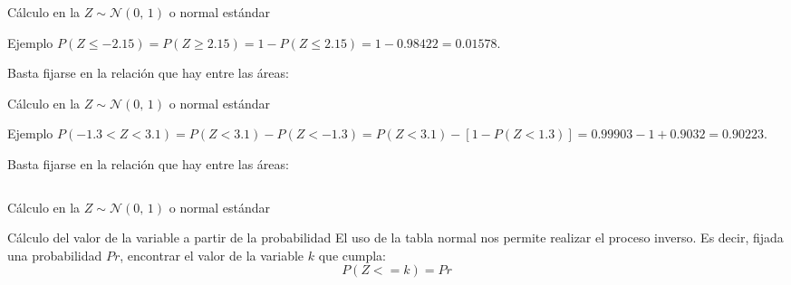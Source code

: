 \documentclass[11pt,handout]{beamer}
\begin{document}
\begin{frame}{Cálculo en la $Z \sim \mathcal{N}(0,\,1)$ o normal estándar}
\begin{block}{Ejemplo}
$P\left(Z\leq -2.15 \right)=P\left(Z\geq 2.15 \right)=1-P\left(Z\leq 2.15 \right)=1-0.98422=0.01578$.
\end{block}
Basta fijarse en la relación que hay entre las áreas:
\begin{center}
    
\end{center}
\end{frame}

\begin{frame}{Cálculo en la $Z \sim \mathcal{N}(0,\,1)$ o normal estándar}
\begin{block}{Ejemplo}
$P\left( -1.3 < Z < 3.1\right)=P\left( Z < 3.1\right)-P\left(  Z < -1.3\right)=
    P\left( Z < 3.1\right) - \left[ 1 - P\left(  Z < 1.3\right) \right]= 0.99903 - 1 + 0.9032 = 0.90223$.
\end{block}
Basta fijarse en la relación que hay entre las áreas:
\begin{center}
    
\end{center}

\begin{columns}
\begin{column}{0.5\textwidth}
 
\end{column}
\begin{column}{0.5\textwidth}
 
\end{column}
\end{columns}
\end{frame}

\begin{frame}{Cálculo en la $Z \sim \mathcal{N}(0,\,1)$ o normal estándar}
\begin{block}{Cálculo del valor de la variable a partir de la probabilidad}
El uso de la tabla normal nos permite realizar el proceso inverso. Es decir, fijada una probabilidad $Pr$, encontrar el valor de la variable $k$ que cumpla:
$$P(Z<=k)=Pr$$
    \begin{center}
        
    \end{center}
\end{block}

\end{frame}
\end{document}
